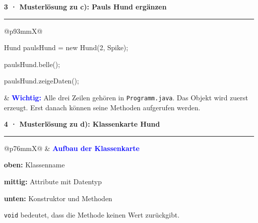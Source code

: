 \documentclass[10pt,a4paper]{article}
\newcommand{\sectiontitle}[2]{%
  \vspace{2.3mm}
  {\color{#1}\bfseries\large #2}\par
  \vspace{0.8mm}
  {\color{#1}\rule{\linewidth}{0.7pt}}\par
  \vspace{1.2mm}
}
\begin{document}
\sectiontitle{Blue}{3 · Musterlösung zu c): Pauls Hund ergänzen}

\begin{tabularx}{\linewidth}{@{}p{93mm}X@{}}
  \colorbox{CodeBg}{\parbox{87mm}{%
    \vspace{1.5mm}
    \ttfamily\small
    Hund paulsHund = new Hund(2, \textquotedbl{}Spike\textquotedbl{});\par
    paulsHund.belle();\par
    paulsHund.zeigeDaten();\par
    \vspace{1.5mm}
  }} &
  \small
  \textcolor{Blue}{\bfseries Wichtig:}
  Alle drei Zeilen gehören in \texttt{Programm.java}. Das Objekt wird zuerst
  erzeugt. Erst danach können seine Methoden aufgerufen werden.
\end{tabularx}

\sectiontitle{Blue}{4 · Musterlösung zu d): Klassenkarte Hund}

\begin{tabularx}{\linewidth}{@{}p{76mm}X@{}}
   &
  \small
  \textcolor{Blue}{\bfseries Aufbau der Klassenkarte}

  \vspace{1mm}
  \textbf{oben:} Klassenname

  \textbf{mittig:} Attribute mit Datentyp

  \textbf{unten:} Konstruktor und Methoden

  \vspace{1mm}
  \texttt{void} bedeutet, dass die Methode keinen Wert zurückgibt.
\end{tabularx}
\end{document}
